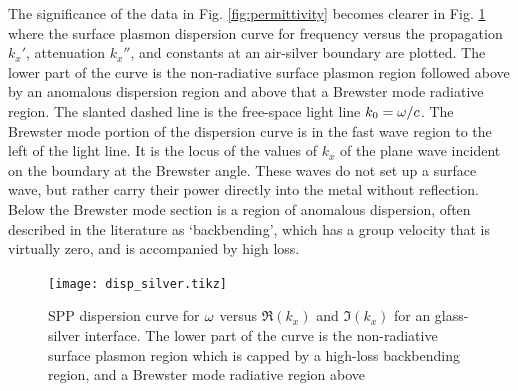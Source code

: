 \documentclass[11pt]{article}
\begin{document}
The significance of the data in Fig. \ref{fig:permittivity} becomes clearer in Fig. \ref{fig:dispersion} where the surface plasmon dispersion curve for frequency versus the propagation $k_x'$, attenuation $k_x''$, and constants at an air-silver boundary are plotted. The lower part of the curve is the non-radiative surface plasmon region followed above by an anomalous dispersion region and above that a Brewster mode radiative region. The slanted dashed line is the free-space light line $k_0 = \omega/c$. The Brewster mode portion of the dispersion curve is in the fast wave region to the left of the light line. It is the locus of the values of $k_x$ of the plane wave incident on the boundary at the Brewster angle. These waves do not set up a surface wave, but rather carry their power directly into the metal without reflection. Below the Brewster mode section is a region of anomalous dispersion, often described in the literature as `backbending', which has a group velocity that is virtually zero, and is accompanied by high loss.
%
\begin{figure}[t!]
  \centering
  {\texttt{[image: disp\_silver.tikz]}}
  \caption{SPP dispersion curve for $\omega$ versus $\Re (k_x)$ and $\Im (k_x)$ for an glass-silver interface. The lower part of the curve is the non-radiative surface plasmon region which is capped by a high-loss backbending region, and a Brewster mode radiative region above}
  \label{fig:dispersion}
\end{figure}
%
\end{document}
